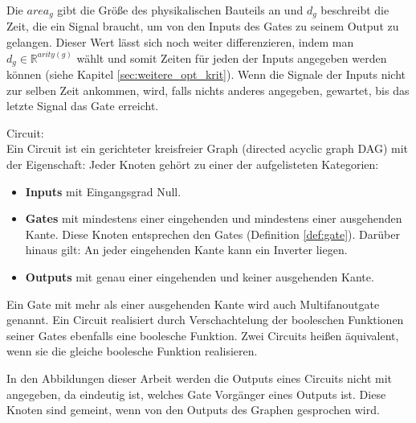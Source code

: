 \documentclass[11pt, a4paper, german]{article}
\begin{document}
Die $area_g$ gibt die Größe des physikalischen Bauteils an und $d_g$ beschreibt die Zeit, die ein Signal braucht, um von den Inputs des Gates zu seinem Output zu gelangen. Dieser Wert lässt sich noch weiter differenzieren, indem man $d_g \in \mathbb{R}^{arity(g)}$ wählt und somit Zeiten für jeden der Inputs angegeben werden können (siehe Kapitel  \ref{sec:weitere_opt_krit}).
Wenn die Signale der Inputs nicht zur selben Zeit ankommen, wird, falls nichts anderes angegeben, gewartet, bis das letzte Signal das Gate erreicht.

\begin{definition}{Circuit:}\\
Ein Circuit ist ein gerichteter kreisfreier Graph (directed acyclic graph DAG) mit der Eigenschaft: Jeder Knoten gehört zu einer der aufgelisteten Kategorien: 
\begin{itemize}
\item {\bf Inputs }mit Eingangsgrad Null.
\item{\bf Gates} mit mindestens einer eingehenden und mindestens einer ausgehenden Kante.
Diese Knoten entsprechen den Gates (Definition \ref{def:gate}). Darüber hinaus gilt: An jeder eingehenden Kante kann ein Inverter liegen.
\item{\bf Outputs} mit genau einer eingehenden und keiner ausgehenden Kante.
\end{itemize}
Ein Gate mit mehr als einer ausgehenden Kante wird auch Multifanoutgate genannt.
Ein Circuit realisiert durch Verschachtelung der booleschen Funktionen seiner Gates ebenfalls eine boolesche Funktion. Zwei Circuits heißen äquivalent, wenn sie die gleiche boolesche Funktion realisieren.
\end{definition}

In den Abbildungen dieser Arbeit werden die Outputs eines Circuits nicht mit angegeben, da eindeutig ist, welches Gate Vorgänger eines Outputs ist. Diese Knoten sind gemeint, wenn von den Outputs des Graphen gesprochen wird. 
\end{document}
